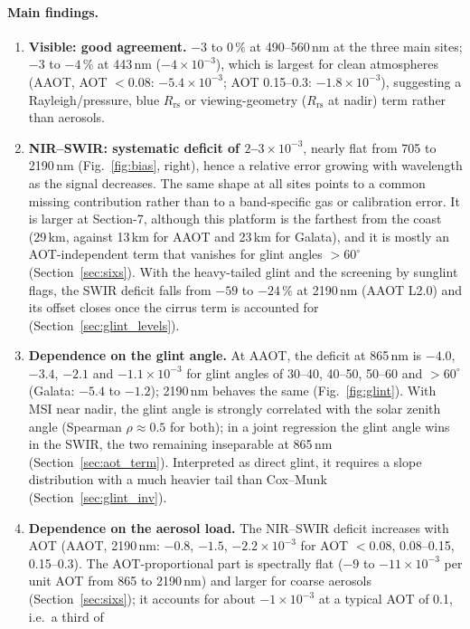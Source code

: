 \documentclass[11pt,a4paper]{article}
\newcommand{\Rrs}{R_\mathrm{rs}}
\begin{document}
\paragraph{Main findings.}
\begin{enumerate}
\item \textbf{Visible: good agreement.} $-3$ to $0\,\%$ at 490--560\,nm at the three main sites; $-3$ to $-4\,\%$
  at 443\,nm ($-4\times10^{-3}$), which is largest for clean atmospheres (AAOT, AOT $<0.08$: $-5.4\times10^{-3}$;
  AOT 0.15--0.3: $-1.8\times10^{-3}$), suggesting a Rayleigh/pressure, blue $\Rrs$ or viewing-geometry
  ($\Rrs$ at nadir) term rather than aerosols.
\item \textbf{NIR--SWIR: systematic deficit of $2$--$3\times10^{-3}$}, nearly flat from 705 to 2190\,nm
  (Fig.~\ref{fig:bias}, right), hence a relative error growing with wavelength as the signal decreases. The same
  shape at all sites points to a common missing contribution rather than to a band-specific gas or calibration
  error. It is larger at Section-7, although this platform is the farthest from the coast (29\,km, against 13\,km
  for AAOT and 23\,km for Galata), and it is mostly an AOT-independent term that vanishes for glint angles
  $>60^\circ$ (Section~\ref{sec:sixs}). With the heavy-tailed glint and the screening by sunglint flags, the SWIR
  deficit falls from $-59$ to $-24\,\%$ at 2190\,nm (AAOT L2.0) and its offset closes once the cirrus term is
  accounted for (Section~\ref{sec:glint_levels}).
\item \textbf{Dependence on the glint angle.} At AAOT, the deficit at 865\,nm is $-4.0$, $-3.4$, $-2.1$ and
  $-1.1\times10^{-3}$ for glint angles of 30--40, 40--50, 50--60 and $>60^\circ$ (Galata: $-5.4$ to $-1.2$);
  2190\,nm behaves the same (Fig.~\ref{fig:glint}). With MSI near nadir, the glint angle is strongly correlated
  with the solar zenith angle (Spearman $\rho\approx0.5$ for both); in a joint regression the glint angle wins
  in the SWIR, the two remaining inseparable at 865\,nm (Section~\ref{sec:aot_term}). Interpreted as direct
  glint, it requires a slope distribution with a much heavier tail than Cox--Munk (Section~\ref{sec:glint_inv}).
\item \textbf{Dependence on the aerosol load.} The NIR--SWIR deficit increases with AOT (AAOT, 2190\,nm:
  $-0.8$, $-1.5$, $-2.2\times10^{-3}$ for AOT $<0.08$, 0.08--0.15, 0.15--0.3). The AOT-proportional part is
  spectrally flat ($-9$ to $-11\times10^{-3}$ per unit AOT from 865 to 2190\,nm) and larger for coarse aerosols
  (Section~\ref{sec:sixs}); it accounts for about $-1\times10^{-3}$ at a typical AOT of 0.1, i.e.\ a third of

\end{enumerate}
\end{document}
